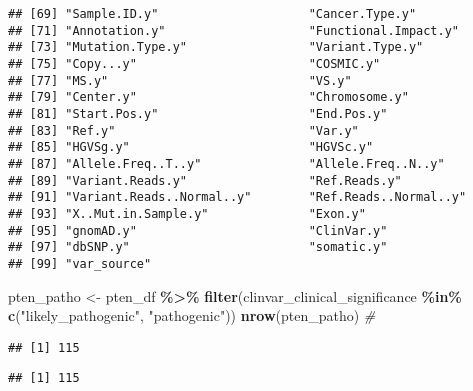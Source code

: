 \documentclass[
]{article}
\newenvironment{Shaded}{\begin{snugshade}}{\end{snugshade}}
\newcommand{\CommentTok}[1]{\textcolor[rgb]{0.56,0.35,0.01}{\textit{#1}}}
\newcommand{\FunctionTok}[1]{\textcolor[rgb]{0.13,0.29,0.53}{\textbf{#1}}}
\newcommand{\NormalTok}[1]{#1}
\newcommand{\OtherTok}[1]{\textcolor[rgb]{0.56,0.35,0.01}{#1}}
\newcommand{\SpecialCharTok}[1]{\textcolor[rgb]{0.81,0.36,0.00}{\textbf{#1}}}
\newcommand{\StringTok}[1]{\textcolor[rgb]{0.31,0.60,0.02}{#1}}
\begin{document}
\begin{verbatim}
## [69] "Sample.ID.y"                     "Cancer.Type.y"                  
## [71] "Annotation.y"                    "Functional.Impact.y"            
## [73] "Mutation.Type.y"                 "Variant.Type.y"                 
## [75] "Copy...y"                        "COSMIC.y"                       
## [77] "MS.y"                            "VS.y"                           
## [79] "Center.y"                        "Chromosome.y"                   
## [81] "Start.Pos.y"                     "End.Pos.y"                      
## [83] "Ref.y"                           "Var.y"                          
## [85] "HGVSg.y"                         "HGVSc.y"                        
## [87] "Allele.Freq..T..y"               "Allele.Freq..N..y"              
## [89] "Variant.Reads.y"                 "Ref.Reads.y"                    
## [91] "Variant.Reads..Normal..y"        "Ref.Reads..Normal..y"           
## [93] "X..Mut.in.Sample.y"              "Exon.y"                         
## [95] "gnomAD.y"                        "ClinVar.y"                      
## [97] "dbSNP.y"                         "somatic.y"                      
## [99] "var_source"
\end{verbatim}

\begin{Shaded}
\begin{Highlighting}[]
\NormalTok{pten\_patho }\OtherTok{\textless{}{-}}\NormalTok{ pten\_df }\SpecialCharTok{\%\textgreater{}\%} \FunctionTok{filter}\NormalTok{(clinvar\_clinical\_significance }\SpecialCharTok{\%in\%} \FunctionTok{c}\NormalTok{(}\StringTok{"likely\_pathogenic"}\NormalTok{, }\StringTok{"pathogenic"}\NormalTok{))}
\FunctionTok{nrow}\NormalTok{(pten\_patho) }\CommentTok{\#}
\end{Highlighting}
\end{Shaded}

\begin{verbatim}
## [1] 115
\end{verbatim}

\begin{Shaded}
\end{Shaded}

\begin{verbatim}
## [1] 115
\end{verbatim}
\end{document}
